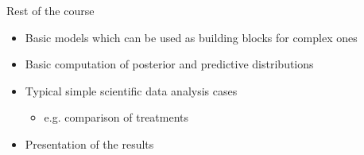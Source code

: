 \documentclass[10pt]{beamer}
\begin{document}
%
%

\begin{frame}{Rest of the course}

  \begin{itemize}
  \item Basic models which can be used as building blocks for complex ones
    \vspace{\baselineskip}
  \item Basic computation of posterior and predictive distributions
    \vspace{\baselineskip}
  \item Typical simple scientific data analysis cases
     \begin{itemize}
     \item e.g. comparison of treatments
     \end{itemize}
    \vspace{\baselineskip}
  \item Presentation of the results
  \end{itemize}
\end{frame}
\end{document}

